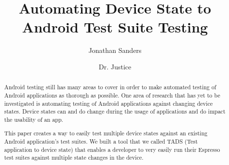 \documentclass[sigconf]{acmart}
\begin{document}
\title{Automating Device State to Android Test Suite Testing }

\author{Jonathan Sanders}

\author{Dr. Justice}





\begin{abstract}
Android testing still has many areas to cover in order to make automated testing of Android applications as thorough as possible.  One area of research that has yet to be investigated is automating testing of Android applications against changing device states.  Device states can and do change during the usage of applications and do impact the usability of an app.

This paper creates a way to easily test multiple device states against an existing Android application's test suites.  We built a tool that we called TADS (Test application to device state) that enables a developer to very easily run their Espresso test suites against multiple state changes in the device.  
\end{abstract}





\maketitle




 
\end{document}

